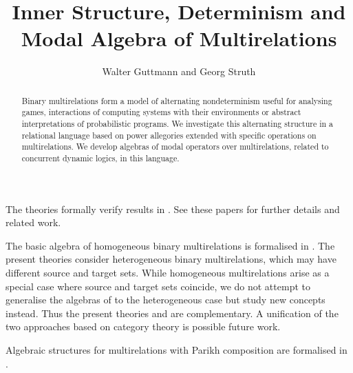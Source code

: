 \documentclass[11pt,a4paper]{article}
\begin{document}
\title{Inner Structure, Determinism and Modal Algebra of Multirelations}
\author{Walter Guttmann and Georg Struth}
\maketitle

\begin{abstract}
  Binary multirelations form a model of alternating nondeterminism useful for analysing games, interactions of computing systems with their environments or abstract interpretations of probabilistic programs.
  We investigate this alternating structure in a relational language based on power allegories extended with specific operations on multirelations.
  We develop algebras of modal operators over multirelations, related to concurrent dynamic logics, in this language.
\end{abstract}

\tableofcontents

\bigskip

\noindent
The theories formally verify results in \cite{FurusawaGuttmannStruth2023a,FurusawaGuttmannStruth2023b,FurusawaGuttmannStruth2023c}.
See these papers for further details and related work.

The basic algebra of homogeneous binary multirelations is formalised in \cite{FurusawaStruth2015}.
The present theories consider heterogeneous binary multirelations, which may have different source and target sets.
While homogeneous multirelations arise as a special case where source and target sets coincide, we do not attempt to generalise the algebras of \cite{FurusawaStruth2015} to the heterogeneous case but study new concepts instead.
Thus the present theories and \cite{FurusawaStruth2015} are complementary.
A unification of the two approaches based on category theory is possible future work.

Algebraic structures for multirelations with Parikh composition are formalised in \cite{Guttmann2021b}.

\begin{flushleft}

\end{flushleft}



\end{document}
